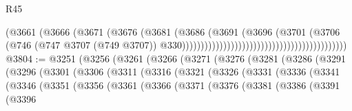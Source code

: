 \begin{lexlean}{R45}
\begin{coremodule}
                                                                      (@3661
                                                                        (@3666
                                                                          (@3671
                                                                            (@3676
                                                                              (@3681
                                                                                (@3686
                                                                                  (@3691
                                                                                    (@3696
                                                                                      (@3701
                                                                                        (@3706
                                                                                          (@746
                                                                                            (@747
                                                                                              @3707
                                                                                              (@749
                                                                                                @3707))
                                                                                            @330))))))))))))))))))))))))))))))))))))))))))))
@3804 := @3251
    (@3256
      (@3261
        (@3266
          (@3271
            (@3276
              (@3281
                (@3286
                  (@3291
                    (@3296
                      (@3301
                        (@3306
                          (@3311
                            (@3316
                              (@3321
                                (@3326
                                  (@3331
                                    (@3336
                                      (@3341
                                        (@3346
                                          (@3351
                                            (@3356
                                              (@3361
                                                (@3366
                                                  (@3371
                                                    (@3376
                                                      (@3381
                                                        (@3386
                                                          (@3391
                                                            (@3396

\end{coremodule}
\end{lexlean}
